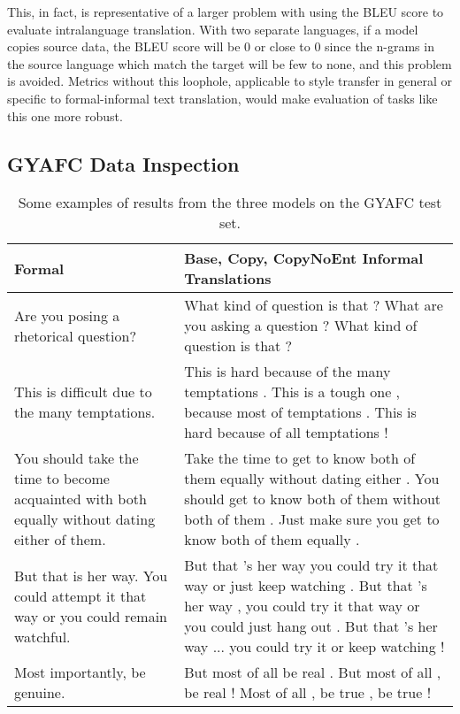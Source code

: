 This, in fact, is representative of a larger problem with using the BLEU score to evaluate intralanguage translation. With two separate languages, if a model copies source data, the BLEU score will be 0 or close to 0 since the n-grams in the source language which match the target will be few to none, and this problem is avoided. Metrics without this loophole, applicable to style transfer in general or specific to formal-informal text translation, would make evaluation of tasks like this one more robust.

\subsection{GYAFC Data Inspection}

\begin{table}[h]
\centering
 \begin{tabular}{|| p{4cm} | p{8cm} ||} 
 \hline
 Formal & Base, Copy, CopyNoEnt Informal Translations \\ [0.3ex] 
 \hline\hline
 Are you posing a rhetorical question? & 
    What kind of question is that ? 
    \newline What are you asking a question ? 
    \newline What kind of question is that ? \\
 \hline
 This is difficult due to the many temptations. & 
    This is hard because of the many temptations . 
    \newline This is a tough one , because most of temptations . 
    \newline This is hard because of all temptations ! \\
 \hline
 You should take the time to become acquainted with both equally without dating either of them. & 
    Take the time to get to know both of them equally without dating either . 
    \newline You should get to know both of them without both of them .
    \newline Just make sure you get to know both of them equally . \\
 \hline
 But that is her way. You could attempt it that way or you could remain watchful. & 
    But that 's her way you could try it that way or just keep watching . 
    \newline But that 's her way , you could try it that way or you could just hang out .
    \newline But that 's her way ... you could try it or keep watching ! \\
 \hline
 Most importantly, be genuine. & 
    But most of all be real .
    \newline But most of all , be real !
    \newline Most of all , be true , be true ! \\
 \hline
\end{tabular}
\caption{Some examples of results from the three models on the GYAFC test set.}
\label{gyafc-results-picked}
\end{table}

